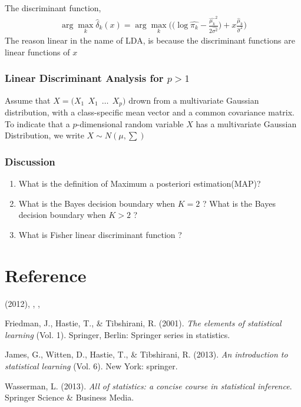     \documentclass[12pt,fleqn,a4paper]{article}%
\theoremstyle{definition}
\theoremstyle{plain}
\numberwithin{equation}{section}
\begin{document}
The discriminant function,
\begin{gather}
\arg\max_{k}  \hat{\delta}_{k}(x) = \arg\max_{k} \bigg( \big( \log \hat{\pi_{k}} -\frac{\hat{\mu_{k}}^{2}}{2 \hat{\sigma^{2}}} \big) + x \frac{\hat{\mu}_{k}}{\hat{\sigma}^{2}} \bigg)
\label{discriminantfunction}
\end{gather}
The reason linear in the name of LDA, is because the discriminant functions are linear functions of $x$

\subsubsection{\textbf{Linear Discriminant Analysis for $p > 1$}}
Assume that $X = \big( X_{1}~~X_{1}~~\dots~~X_{p} \big)$ drown from a multivariate Gaussian distribution, with a class-specific mean vector and a common covariance matrix.
To indicate that a $p$-dimensional random variable $X$ has a multivariate Gaussian Distribution, we write $X \sim N(\mu,\sum)$


\subsubsection{Discussion}
\begin{enumerate}
\item What is the definition of Maximum a posteriori estimation(MAP)?
\item What is the Bayes decision boundary when $K=2$ ? What is the Bayes decision boundary when $K>2$ ?
\item What is Fisher linear discriminant function ?
\end{enumerate}

\section*{Reference}
\noindent
\begin{description}\itemsep=-2pt
\item {\MbQ{}} (2012), {\MaQ{}}{\MbQ{}}, {\McQ{}}, {\MkQ{}}
\item Friedman, J., Hastie, T., \& Tibshirani, R. (2001). {\it{The elements of statistical learning}} (Vol. 1). Springer, Berlin: Springer series in statistics.
\item James, G., Witten, D., Hastie, T., \& Tibshirani, R. (2013). {\it{An introduction to statistical learning}} (Vol. 6). New York: springer.
\item Wasserman, L. (2013). {\it{All of statistics: a concise course in statistical inference}}. Springer Science \& Business Media.
\end{description}
\end{document}
